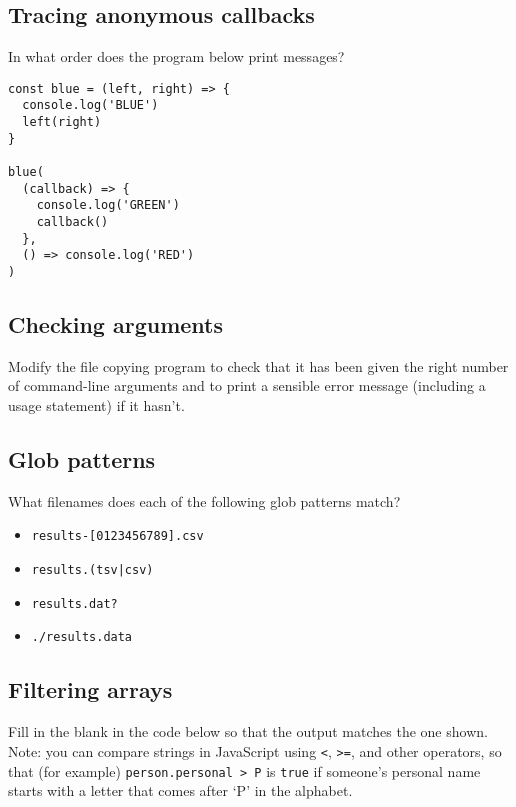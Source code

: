 \documentclass[krantzl]{krantz}
\begin{document}
\subsection*{Tracing anonymous callbacks}


In what order does the program below print messages?


\begin{lstlisting}[frame=tblr]
const blue = (left, right) => {
  console.log('BLUE')
  left(right)
}

blue(
  (callback) => {
    console.log('GREEN')
    callback()
  },
  () => console.log('RED')
)
\end{lstlisting}


\subsection*{Checking arguments}


Modify the file copying program to check that it has been given the right number of command-line arguments
and to print a sensible error message (including a usage statement) if it hasn’t.

\subsection*{Glob patterns}


What filenames does each of the following glob patterns match?

\begin{itemize}

\item \texttt{results-[0123456789].csv}

\item \texttt{results.(tsv|csv)}

\item \texttt{results.dat?}

\item \texttt{./results.data}

\end{itemize}

\subsection*{Filtering arrays}


Fill in the blank in the code below so that the output matches the one shown.
Note: you can compare strings in JavaScript using \texttt{<}, \texttt{>=}, and other operators,
so that (for example) \texttt{person.personal > {\textquotesingle}P{\textquotesingle}} is \texttt{true}
if someone’s personal name starts with a letter that comes after ‘P’ in the alphabet.
\end{document}

